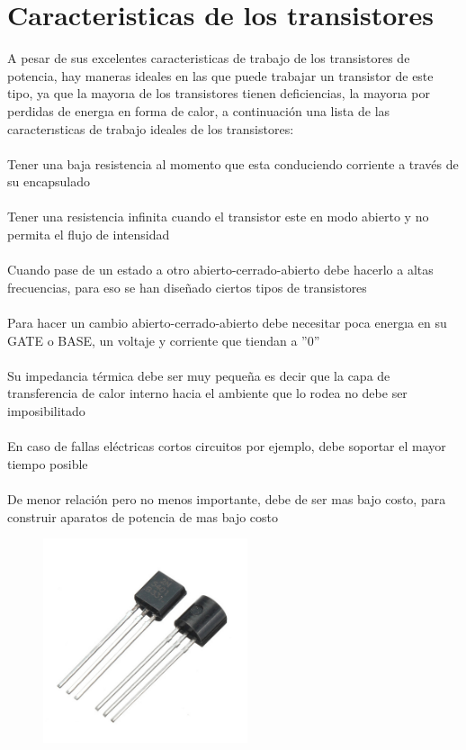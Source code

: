 \documentclass[12pt,a4paper]{article}
\begin{document}
\section{Caracteristicas de los transistores}
A pesar de sus excelentes caracteristicas de trabajo de los transistores de potencia, hay maneras
ideales en las que puede trabajar un transistor de este tipo, ya que la mayorıa de los transistores
tienen deficiencias, la mayorıa por perdidas de energıa en forma de calor, a continuación una lista de
las caracterısticas de trabajo ideales de los transistores:\\\\
Tener una baja resistencia al momento que esta conduciendo corriente a través de su encapsulado\\\\
Tener una resistencia infinita cuando el transistor este en modo abierto y no permita el flujo de
intensidad\\\\
Cuando pase de un estado a otro abierto-cerrado-abierto debe hacerlo a altas frecuencias, para
eso se han diseñado ciertos tipos de transistores\\\\
Para hacer un cambio abierto-cerrado-abierto debe necesitar poca energıa en su GATE o BASE,
un voltaje y corriente que tiendan a ”0”\\\\
Su impedancia térmica debe ser muy pequeña es decir que la capa de transferencia de calor
interno hacia el ambiente que lo rodea no debe ser imposibilitado\\\\
En caso de fallas eléctricas cortos circuitos por ejemplo, debe soportar el mayor tiempo posible\\\\
De menor relación pero no menos importante, debe de ser mas bajo costo, para construir aparatos
de potencia de mas bajo costo\\

\begin{figure}[h!]
\centering
\includegraphics[width=6cm]{transistor.jpg} 
\end{figure}
\end{document}
